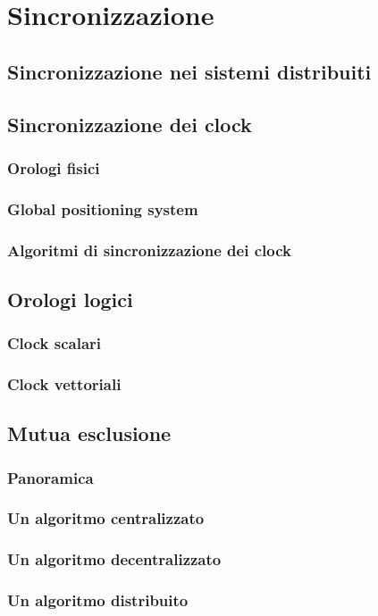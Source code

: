 \section{Sincronizzazione}
\subsection{Sincronizzazione nei sistemi distribuiti}
\subsection{Sincronizzazione dei clock}
\subsubsection{Orologi fisici}
\subsubsection{Global positioning system}
\subsubsection{Algoritmi di sincronizzazione dei clock}
\subsection{Orologi logici}
\subsubsection{Clock scalari}
\subsubsection{Clock vettoriali}
\subsection{Mutua esclusione}
\subsubsection{Panoramica}
\subsubsection{Un algoritmo centralizzato}
\subsubsection{Un algoritmo decentralizzato}
\subsubsection{Un algoritmo distribuito}
